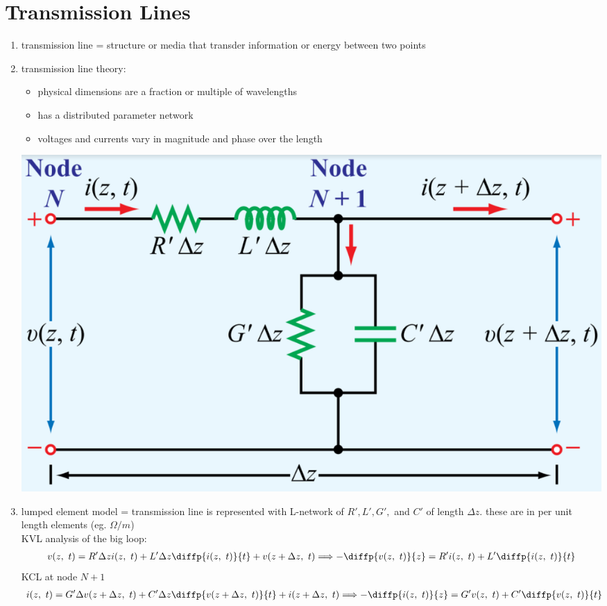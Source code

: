 \documentclass[a4paper,11pt]{article}
\begin{document}
	\section{Transmission Lines}
	\begin{enumerate}
		\item transmission line = structure or media that transder information or energy between two points
		\item transmission line theory:
			\begin{itemize}
				\item physical dimensions are a fraction or multiple of wavelengths
				\item has a distributed parameter network
				\item voltages and currents vary in magnitude and phase over the length
			\end{itemize}
		\begin{center}
			\includegraphics[scale=0.25]{lumped_elements.png}
		\end{center}
		\item lumped element model = transmission line is represented with L-network of $R', L', G',$ and $C'$ of length $\Delta z$. these are in per unit length elements (eg. $\Omega / m$)\\
		KVL analysis of the big loop: 
		\begin{align*}
			v(z,~t) = R'\Delta zi(z,~t) + L'\Delta z\diffp{i(z,~t)}{t} + v(z + \Delta z,~t) &\Longrightarrow -\diffp{v(z,~t)}{z} =  R'i(z,~t) + L'\diffp{i(z,~t)}{t} \\
		\end{align*}
		KCL at node $N+ 1$
		\begin{align*}
			i(z,~t) = G'\Delta v(z + \Delta z,~t) + C'\Delta z\diffp{v(z + \Delta z,~t)}{t} + i(z + \Delta z,~t) &\Longrightarrow -\diffp{i(z,~t)}{z} =  G'v(z,~t) + C'\diffp{v(z,~t)}{t} \\

\end{align*}
\end{enumerate}
\end{document}
